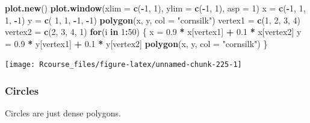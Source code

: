 \documentclass[]{book}
\newenvironment{Shaded}{\begin{snugshade}}{\end{snugshade}}
\newcommand{\KeywordTok}[1]{\textcolor[rgb]{0.13,0.29,0.53}{\textbf{#1}}}
\newcommand{\DataTypeTok}[1]{\textcolor[rgb]{0.13,0.29,0.53}{#1}}
\newcommand{\DecValTok}[1]{\textcolor[rgb]{0.00,0.00,0.81}{#1}}
\newcommand{\FloatTok}[1]{\textcolor[rgb]{0.00,0.00,0.81}{#1}}
\newcommand{\StringTok}[1]{\textcolor[rgb]{0.31,0.60,0.02}{#1}}
\newcommand{\ControlFlowTok}[1]{\textcolor[rgb]{0.13,0.29,0.53}{\textbf{#1}}}
\newcommand{\OperatorTok}[1]{\textcolor[rgb]{0.81,0.36,0.00}{\textbf{#1}}}
\newcommand{\NormalTok}[1]{#1}
\theoremstyle{definition}
\theoremstyle{definition}
\theoremstyle{definition}
\theoremstyle{remark}
\begin{document}
\begin{Shaded}
\begin{Highlighting}[]
\KeywordTok{plot.new}\NormalTok{()}
\KeywordTok{plot.window}\NormalTok{(}\DataTypeTok{xlim =} \KeywordTok{c}\NormalTok{(}\OperatorTok{-}\DecValTok{1}\NormalTok{, }\DecValTok{1}\NormalTok{), }\DataTypeTok{ylim =} \KeywordTok{c}\NormalTok{(}\OperatorTok{-}\DecValTok{1}\NormalTok{, }\DecValTok{1}\NormalTok{), }\DataTypeTok{asp =} \DecValTok{1}\NormalTok{)}
\NormalTok{x =}\StringTok{ }\KeywordTok{c}\NormalTok{(}\OperatorTok{-}\DecValTok{1}\NormalTok{, }\DecValTok{1}\NormalTok{, }\DecValTok{1}\NormalTok{, }\OperatorTok{-}\DecValTok{1}\NormalTok{)}
\NormalTok{y =}\StringTok{ }\KeywordTok{c}\NormalTok{( }\DecValTok{1}\NormalTok{, }\DecValTok{1}\NormalTok{, }\OperatorTok{-}\DecValTok{1}\NormalTok{, }\OperatorTok{-}\DecValTok{1}\NormalTok{)}
\KeywordTok{polygon}\NormalTok{(x, y, }\DataTypeTok{col =} \StringTok{"cornsilk"}\NormalTok{)}
\NormalTok{vertex1 =}\StringTok{ }\KeywordTok{c}\NormalTok{(}\DecValTok{1}\NormalTok{, }\DecValTok{2}\NormalTok{, }\DecValTok{3}\NormalTok{, }\DecValTok{4}\NormalTok{)}
\NormalTok{vertex2 =}\StringTok{ }\KeywordTok{c}\NormalTok{(}\DecValTok{2}\NormalTok{, }\DecValTok{3}\NormalTok{, }\DecValTok{4}\NormalTok{, }\DecValTok{1}\NormalTok{)}
\ControlFlowTok{for}\NormalTok{(i }\ControlFlowTok{in} \DecValTok{1}\OperatorTok{:}\DecValTok{50}\NormalTok{) \{}
\NormalTok{    x =}\StringTok{ }\FloatTok{0.9} \OperatorTok{*}\StringTok{ }\NormalTok{x[vertex1] }\OperatorTok{+}\StringTok{ }\FloatTok{0.1} \OperatorTok{*}\StringTok{ }\NormalTok{x[vertex2]}
\NormalTok{    y =}\StringTok{ }\FloatTok{0.9} \OperatorTok{*}\StringTok{ }\NormalTok{y[vertex1] }\OperatorTok{+}\StringTok{ }\FloatTok{0.1} \OperatorTok{*}\StringTok{ }\NormalTok{y[vertex2]}
    \KeywordTok{polygon}\NormalTok{(x, y, }\DataTypeTok{col =} \StringTok{"cornsilk"}\NormalTok{)}
\NormalTok{\}}
\end{Highlighting}
\end{Shaded}

\texttt{[image: Rcourse\_files/figure-latex/unnamed-chunk-225-1]}

\subsubsection{Circles}\label{circles}

Circles are just dense polygons.
\end{document}
